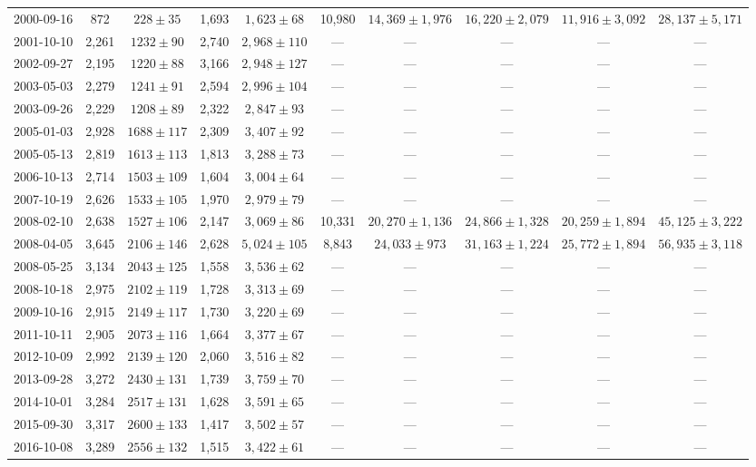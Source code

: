 \begin{landscape}
\begin{longtable}{cccccccccc}
{2000-09-16} & 872 & {$228  \pm  35$} & 1,693 & {$1,623 \pm 68$} & 10,980 & {$14,369 \pm 1,976$} & {$16,220 \pm 2,079$} & {$11,916 \pm 3,092$} & {$28,137 \pm 5,171$} \\
{2001-10-10} & 2,261 & {$1232  \pm  90$} & 2,740 & {$2,968 \pm 110$} & --- & --- & --- & --- & --- \\
{2002-09-27} & 2,195 & {$1220  \pm  88$} & 3,166 & {$2,948 \pm 127$} & --- & --- & --- & --- & --- \\
{2003-05-03} & 2,279 & {$1241  \pm  91$} & 2,594 & {$2,996 \pm 104$} & --- & --- & --- & --- & --- \\
{2003-09-26} & 2,229 & {$1208  \pm  89$} & 2,322 & {$2,847 \pm 93$} & --- & --- & --- & --- & --- \\
{2005-01-03} & 2,928 & {$1688  \pm  117$} & 2,309 & {$3,407 \pm 92$} & --- & --- & --- & --- & --- \\
{2005-05-13} & 2,819 & {$1613  \pm  113$} & 1,813 & {$3,288 \pm 73$} & --- & --- & --- & --- & --- \\
{2006-10-13} & 2,714 & {$1503  \pm  109$} & 1,604 & {$3,004 \pm 64$} & --- & --- & --- & --- & --- \\
{2007-10-19} & 2,626 & {$1533  \pm  105$} & 1,970 & {$2,979 \pm 79$} & --- & --- & --- & --- & --- \\
{2008-02-10} & 2,638 & {$1527  \pm  106$} & 2,147 & {$3,069 \pm 86$} & 10,331 & {$20,270 \pm 1,136$} & {$24,866 \pm 1,328$} & {$20,259 \pm 1,894$} & {$45,125 \pm 3,222$} \\
{2008-04-05} & 3,645 & {$2106  \pm  146$} & 2,628 & {$5,024 \pm 105$} & 8,843 & {$24,033 \pm 973$} & {$31,163 \pm 1,224$} & {$25,772 \pm 1,894$} & {$56,935 \pm 3,118$} \\
{2008-05-25} & 3,134 & {$2043  \pm  125$} & 1,558 & {$3,536 \pm 62$} & --- & --- & --- & --- & --- \\
{2008-10-18} & 2,975 & {$2102  \pm  119$} & 1,728 & {$3,313 \pm 69$} & --- & --- & --- & --- & --- \\
{2009-10-16} & 2,915 & {$2149  \pm  117$} & 1,730 & {$3,220 \pm 69$} & --- & --- & --- & --- & --- \\
{2011-10-11} & 2,905 & {$2073  \pm  116$} & 1,664 & {$3,377 \pm 67$} & --- & --- & --- & --- & --- \\
{2012-10-09} & 2,992 & {$2139  \pm  120$} & 2,060 & {$3,516 \pm 82$} & --- & --- & --- & --- & --- \\
{2013-09-28} & 3,272 & {$2430  \pm  131$} & 1,739 & {$3,759 \pm 70$} & --- & --- & --- & --- & --- \\
{2014-10-01} & 3,284 & {$2517  \pm  131$} & 1,628 & {$3,591 \pm 65$} & --- & --- & --- & --- & --- \\
{2015-09-30} & 3,317 & {$2600  \pm  133$} & 1,417 & {$3,502 \pm 57$} & --- & --- & --- & --- & --- \\
{2016-10-08} & 3,289 & {$2556  \pm  132$} & 1,515 & {$3,422 \pm 61$} & --- & --- & --- & --- & --- \\
\end{longtable} 
\end{landscape} 
